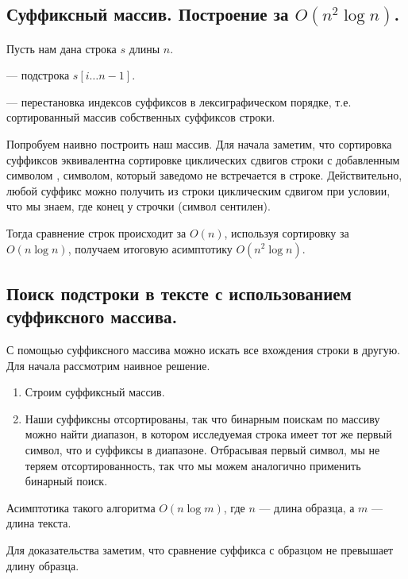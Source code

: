 \subsection{Суффиксный массив. Построение за $O(n^2 \log n)$.}
Пусть нам дана строка $s$ длины $n$.
\begin{definition}
         --- подстрока $s[i\ldots n-1]$.
\end{definition}
\begin{definition}
         --- перестановка индексов суффиксов в лексиграфическом порядке, 
        т.е. сортированный массив собственных суффиксов строки.
\end{definition}

Попробуем наивно построить наш массив. Для начала заметим, что сортировка суффиксов эквивалентна
сортировке циклических сдвигов строки с добавленным символом , символом, который заведомо
не встречается в строке. Действительно, любой суффикс можно получить из строки циклическим сдвигом при
условии, что мы знаем, где конец у строчки (символ сентилен).

Тогда сравнение строк происходит за $O(n)$, используя сортировку за $O(n\log n)$, получаем итоговую
асимптотику $O(n^2 \log n)$.

\subsection{Поиск подстроки в тексте с использованием суффиксного массива.}

С помощью суффиксного массива можно искать все вхождения строки в другую. Для начала рассмотрим
наивное решение.

\begin{enumerate}
        \item Строим суффиксный массив.
        \item Наши суффиксны отсортированы, так что бинарным поискам по массиву можно найти диапазон,
        в котором исследуемая строка имеет тот же первый символ, что и суффиксы в диапазоне.
        Отбрасывая первый символ, мы не теряем отсортированность, так что мы можем аналогично
        применить бинарный поиск.
\end{enumerate}

\begin{remark}
        Асимптотика такого алгоритма $O(n \log m)$, где  $n$ --- длина образца, а $m$ --- длина текста.
\end{remark}
Для доказательства заметим, что сравнение суффикса с образцом не превышает длину образца.

